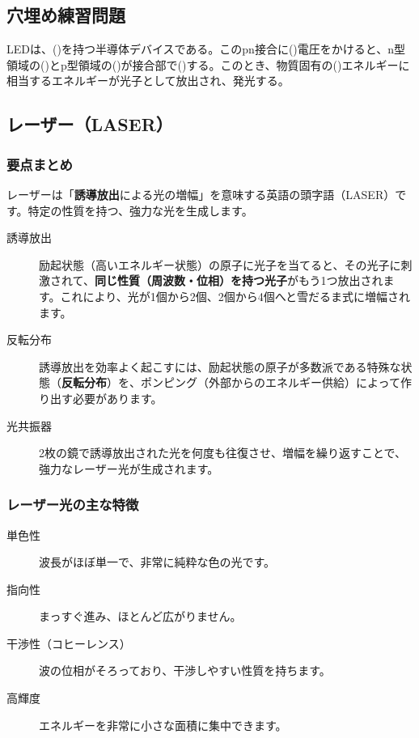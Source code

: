 \documentclass[11pt,a4paper]{ltjsarticle}
\newcommand{\blank}[1][3cm]{\underline{\hspace{#1}}}
\begin{document}
\subsection{穴埋め練習問題}
LEDは、(\blank)を持つ半導体デバイスである。このpn接合に(\blank[2cm])電圧をかけると、n型領域の(\blank[1.5cm])とp型領域の(\blank[1.5cm])が接合部で(\blank[2cm])する。このとき、物質固有の(\blank)エネルギーに相当するエネルギーが光子として放出され、発光する。

\subsection{レーザー（LASER）}
\subsubsection{要点まとめ}
レーザーは「\textbf{誘導放出}による光の増幅」を意味する英語の頭字語（LASER）です。特定の性質を持つ、強力な光を生成します。

\begin{tcolorbox}[colback=blue!5!white,colframe=blue!75!black,title=レーザーの基本原理]
\begin{description}
    \item[誘導放出] 励起状態（高いエネルギー状態）の原子に光子を当てると、その光子に刺激されて、\textbf{同じ性質（周波数・位相）を持つ光子}がもう1つ放出されます。これにより、光が1個から2個、2個から4個へと雪だるま式に増幅されます。
    \item[反転分布] 誘導放出を効率よく起こすには、励起状態の原子が多数派である特殊な状態（\textbf{反転分布}）を、ポンピング（外部からのエネルギー供給）によって作り出す必要があります。
    \item[光共振器] 2枚の鏡で誘導放出された光を何度も往復させ、増幅を繰り返すことで、強力なレーザー光が生成されます。
\end{description}
\end{tcolorbox}



\subsubsection{レーザー光の主な特徴}
\begin{description}
    \item[単色性] 波長がほぼ単一で、非常に純粋な色の光です。
    \item[指向性] まっすぐ進み、ほとんど広がりません。
    \item[干渉性（コヒーレンス）] 波の位相がそろっており、干渉しやすい性質を持ちます。
    \item[高輝度] エネルギーを非常に小さな面積に集中できます。
\end{description}
\end{document}
